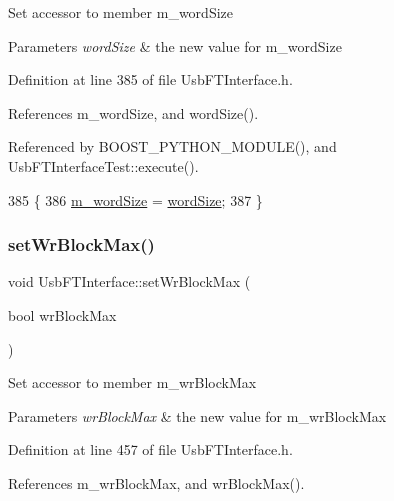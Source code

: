 Set accessor to member m\+\_\+word\+Size 
\begin{DoxyParams}{Parameters}
{\em word\+Size} & the new value for m\+\_\+word\+Size \\
\hline
\end{DoxyParams}


Definition at line 385 of file Usb\+F\+T\+Interface.\+h.



References m\+\_\+word\+Size, and word\+Size().



Referenced by B\+O\+O\+S\+T\+\_\+\+P\+Y\+T\+H\+O\+N\+\_\+\+M\+O\+D\+U\+L\+E(), and Usb\+F\+T\+Interface\+Test\+::execute().


\begin{DoxyCode}
385                                             \{
386     \hyperlink{classUsbFTInterface_a05ccc38a60c4b921b835238b604b38d8}{m\_wordSize} = \hyperlink{classUsbFTInterface_add098ede127a2089e3ac8ea615ed6d46}{wordSize};
387   \}
\end{DoxyCode}
\mbox{\label{classUsbFTInterface_ab2e58c22979ffa60adf609eca2af78d3}} 
\subsubsection{\texorpdfstring{set\+Wr\+Block\+Max()}{setWrBlockMax()}}
{\footnotesize\ttfamily void Usb\+F\+T\+Interface\+::set\+Wr\+Block\+Max (\begin{DoxyParamCaption}\item[{bool}]{wr\+Block\+Max }\end{DoxyParamCaption})\hspace{0.3cm}{\ttfamily [inline]}}

Set accessor to member m\+\_\+wr\+Block\+Max 
\begin{DoxyParams}{Parameters}
{\em wr\+Block\+Max} & the new value for m\+\_\+wr\+Block\+Max \\
\hline
\end{DoxyParams}


Definition at line 457 of file Usb\+F\+T\+Interface.\+h.



References m\+\_\+wr\+Block\+Max, and wr\+Block\+Max().


